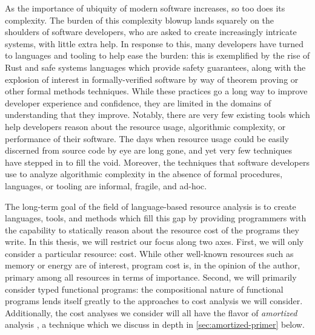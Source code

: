 

As the importance of ubiquity of modern software increases, so too does its complexity. The burden of this complexity blowup lands squarely on the shoulders of software developers, who are asked to create increasingly intricate systems, with little extra help. In response to this, many developers have turned to languages and tooling to help ease the burden: this is exemplified by the rise of Rust and safe systems languages \citehere which provide safety guarantees, along with the explosion of interest in formally-verified software by way of theorem proving or other formal methods techniques. While these practices go a long way to improve developer experience and confidence, they are limited in the domains of understanding that they improve. Notably, there are very few existing tools which help developers reason about the resource usage, algorithmic complexity, or performance of their software. The days when resource usage could be easily discerned from source code by eye are long gone, and yet very few techniques have stepped in to fill the void. Moreover, the techniques that software developers use to analyze algorithmic complexity in the absence of formal procedures, languages, or tooling are informal, fragile, and ad-hoc.

The long-term goal of the field of language-based resource analysis is to create languages, tools, and methods which fill this gap by providing programmers with the capability to statically reason about the resource cost of the programs they write. In this thesis, we will restrict our focus along two axes. First, we will only consider a particular resource: cost. While other well-known resources such as memory or energy are of interest, program cost is, in the opinion of the author, primary among all resources in terms of importance. Second, we will primarily consider typed functional programs: the compositional nature of functional programs lends itself greatly to the approaches to cost analysis we will consider. Additionally, the cost analyses we consider will all have the flavor of \textit{amortized} analysis \cite{tarjan:amortized-complexity}, a technique which we discuss in depth in \autoref{sec:amortized-primer} below.


